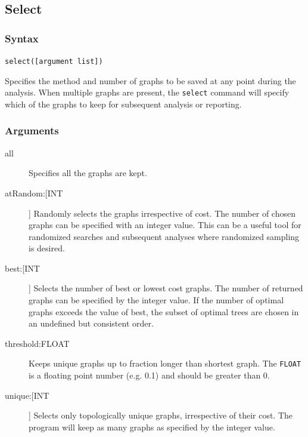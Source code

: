 \subsection{Select}
	\subsubsection{Syntax}
		\texttt{select([argument list])}
	
	\begin{phygdescription}
		{Specifies the method and number of graphs to be saved at any point during the 
		analysis. When multiple graphs are present, the \texttt{select} command will specify 
		which of the graphs to keep for subsequent analysis or reporting.}
	\end{phygdescription}
				
	\subsubsection{Arguments}
		\begin{description}
			\item[all] Specifies all the graphs are kept.
		
			\item[atRandom:[INT]] Randomly selects the graphs irrespective of cost. The 
			number of chosen graphs can be specified with an integer value. This can 
			be a useful tool for randomized searches and subsequent analyses where 
			randomized sampling is desired.
			
			\item[best:[INT]] Selects the number of best or lowest cost graphs. The 
			number of returned graphs can be specified by the integer value. If the number 
			of optimal graphs exceeds the value of best, the subset of optimal trees are chosen 
			in an undefined but consistent order.
							
			\item[threshold:FLOAT] Keeps unique graphs up to fraction longer than shortest 
			graph. The \texttt{FLOAT} is a floating point number (e.g. 0.1) and should be 
			greater than 0.
			
			\item[unique:[INT]] Selects only topologically unique graphs, irrespective of their
			cost. The program will keep as many graphs as specified by the integer value.
		\end{description}


